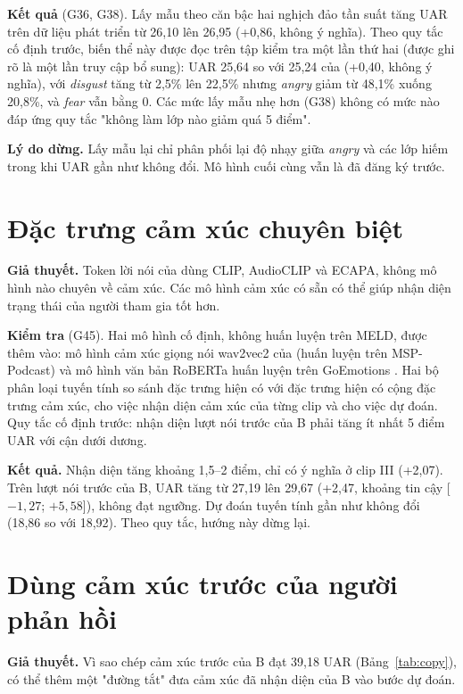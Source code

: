 \textbf{Kết quả} (G36, G38). Lấy mẫu theo căn bậc hai nghịch đảo tần suất tăng UAR trên dữ liệu phát triển từ 26,10 lên 26,95 (+0,86, không ý nghĩa). Theo quy tắc cố định trước, biến thể này được đọc trên tập kiểm tra một lần thứ hai (được ghi rõ là một lần truy cập bổ sung): UAR 25,64 so với 25,24 của \model{} (+0,40, không ý nghĩa), với \emph{disgust} tăng từ 2,5\% lên 22,5\% nhưng \emph{angry} giảm từ 48,1\% xuống 20,8\%, và \emph{fear} vẫn bằng 0. Các mức lấy mẫu nhẹ hơn (G38) không có mức nào đáp ứng quy tắc "không làm lớp nào giảm quá 5 điểm".

\textbf{Lý do dừng.} Lấy mẫu lại chỉ phân phối lại độ nhạy giữa \emph{angry} và các lớp hiếm trong khi UAR gần như không đổi. Mô hình cuối cùng vẫn là \model{} đã đăng ký trước.

\section{Đặc trưng cảm xúc chuyên biệt}

\textbf{Giả thuyết.} Token lời nói của \model{} dùng CLIP, AudioCLIP và ECAPA, không mô hình nào chuyên về cảm xúc. Các mô hình cảm xúc có sẵn có thể giúp nhận diện trạng thái của người tham gia tốt hơn.

\textbf{Kiểm tra} (G45). Hai mô hình cố định, không huấn luyện trên MELD, được thêm vào: mô hình cảm xúc giọng nói wav2vec2 của \citet{wagner2023dawn} (huấn luyện trên MSP-Podcast) và mô hình văn bản RoBERTa huấn luyện trên GoEmotions \cite{demszky2020goemotions}. Hai bộ phân loại tuyến tính so sánh đặc trưng hiện có với đặc trưng hiện có cộng đặc trưng cảm xúc, cho việc nhận diện cảm xúc của từng clip và cho việc dự đoán. Quy tắc cố định trước: nhận diện lượt nói trước của B phải tăng ít nhất 5 điểm UAR với cận dưới dương.

\textbf{Kết quả.} Nhận diện tăng khoảng 1,5--2 điểm, chỉ có ý nghĩa ở clip III (+2,07). Trên lượt nói trước của B, UAR tăng từ 27,19 lên 29,67 (+2,47, khoảng tin cậy [$-1{,}27$; $+5{,}58$]), không đạt ngưỡng. Dự đoán tuyến tính gần như không đổi (18,86 so với 18,92). Theo quy tắc, hướng này dừng lại.

\section{Dùng cảm xúc trước của người phản hồi}

\textbf{Giả thuyết.} Vì sao chép cảm xúc trước của B đạt 39,18 UAR (Bảng~\ref{tab:copy}), có thể thêm một "đường tắt" đưa cảm xúc đã nhận diện của B vào bước dự đoán.


